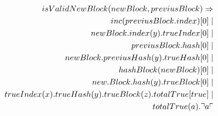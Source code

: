 \begin{align*}
isValidNewBlock(newBlock, previusBlock) \Rightarrow\\
inc(previusBlock.index)[0] \mid \\
newBlock.index(y).trueIndex[0] \mid \\
previusBlock.hash[0] \mid \\
newBlock.previusHash(y).trueHash[0] \mid \\
hashBlock(newBlock)[0] \mid \\
new.Block.hash(y).trueBlock[0] \mid \\
trueIndex(x).trueHash(y).trueBlock(z).totalTrue[true] \mid \\
totalTrue(a).\urcorner a \ulcorner
\end{align*}